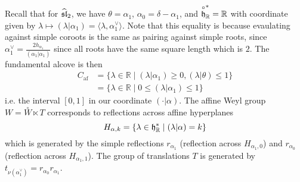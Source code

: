 \documentclass[12pt]{article}
\begin{document}
\begin{example}
    [Affine $\sl_2$] Recall that for $\widehat{\sl}_2$, we have $\theta = \alpha_1$, $\alpha_0 = \delta - \alpha_1$, and $\overset{\circ}{\mf h}^*_\mathbb{R} = \mathbb{R}$ with coordinate given by $\lambda \mapsto (\lambda|\alpha_1) = \langle \lambda, \alpha_1^\vee \rangle$. Note that this equality is because evaulating against simple coroots is the same as pairing against simple roots, since $\alpha_1^\vee = \frac{2 h_{\alpha_1}}{(\alpha_1|\alpha_1)}$ since all roots have the same square length which is $2$.
    The fundamental alcove is then \begin{align*}
        C_{\mathrm{af}} & = \{\lambda \in \mathbb{R} \mid (\lambda|\alpha_1) \geq 0, (\lambda|\theta) \leq 1\} \\
                        & = \{\lambda \in \mathbb{R} \mid 0 \leq (\lambda|\alpha_1) \leq 1\}
    \end{align*} i.e. the interval $[0,1]$ in our coordinate $(\cdot | \alpha)$. The affine Weyl group $W = \overset{\circ}{W} \ltimes T$ corresponds to reflections across affine hyperplanes \[H_{\alpha,k} = \{\lambda \in \mf h^*_\mathbb{R} \mid (\lambda|\alpha) = k\}\] which is generated by the simple reflections $r_{\alpha_1}$ (reflection across $H_{\alpha_1,0}$) and $r_{\alpha_0}$ (reflection across $H_{\alpha_1,1}$). The group of translations $T$ is generated by $t_{\nu(\alpha_1^\vee)} = r_{\alpha_0} r_{\alpha_1}$.


\end{example}
\end{document}

